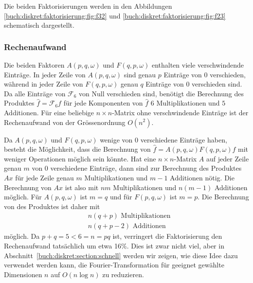 Die beiden Faktorisierungen werden in den Abbildungen
\ref{buch:diskret:faktorisierung:fig:f32}
und
\ref{buch:diskret:faktorisierung:fig:f23}
schematisch dargestellt.

%
%
\subsubsection{Rechenaufwand}
Die beiden Faktoren $A(p,q,\omega)$ und $F(q,p,\omega)$ enthalten
viele verschwindende Einträge.
In jeder Zeile von $A(p,q,\omega)$ sind genau $p$ Einträge von
$0$ verschieden, während in jeder Zeile von $F(q,p,\omega)$ genau
$q$ Einträge von $0$ verschieden sind.
Da alle Einträge von $\mathscr{F}_6$ von Null verschieden sind, benötigt
die Berechnung des Produktes $\hat{f}=\mathscr{F}_6f$ für jede
Komponenten von $\hat{f}$ $6$ Multiplikationen und $5$ Additionen.
Für eine beliebige $n\times n$-Matrix ohne verschwindende Einträge
ist der Rechenaufwand von der Grössenordnung $O(n^2)$.

Da $A(p,q,\omega)$ und $F(q,p,\omega)$ wenige von $0$ verschiedene
Einträge haben, besteht die Möglichkeit, dass die Berechnung
von $\hat{f}=A(p,q,\omega)F(q,p,\omega)f$ mit weniger Operationen
möglich sein könnte.
Hat eine $n\times n$-Matrix $A$ auf jeder Zeile genau $m$ von $0$
verschiedene Einträge, dann sind zur Berechnung des Produktes $Ax$
für jede Zeile genau $m$ Multiplikationen und $m-1$ Additionen
nötig.
Die Berechnung von $Ax$ ist also mit $nm$ Multiplikationen und 
$n(m-1)$ Additionen möglich.
Für $A(p,q,\omega)$ ist $m=q$ und für $F(p,q,\omega)$ ist $m=p$.
Die Berechnung von des Produktes ist daher mit
\begin{align*}
&n(q+p)\text{ Multiplikationen}
\\
&n(q+p-2)\text{ Additionen}
\end{align*}
möglich.
Da $p+q=5<6=n=pq$ ist, verringert die Faktorisierung den Rechenaufwand
tatsächlich um etwa 16\%.
Dies ist zwar nicht viel, aber in Abschnitt~\ref{buch:diskret:section:schnell}
werden wir zeigen, wie diese Idee dazu verwendet werden kann, die
Fourier-Transformation für geeignet gewählte Dimensionen $n$ auf
$O(n\log n)$ zu reduzieren.


